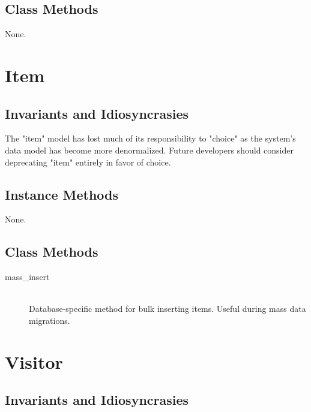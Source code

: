 \documentclass[11pt]{book}
\begin{document}
\subsection{Class Methods}

None.









\section{Item}

\subsection{Invariants and Idiosyncrasies}

The "item" model has lost much of its responsibility to "choice" as the system's data model has become more denormalized.  Future developers should consider deprecating "item" entirely in favor of choice.

\subsection{Instance Methods}

None.

\subsection{Class Methods}

\begin{description}
	\item[mass\_insert]  \hfill \\
  Database-specific method for bulk inserting items.  Useful during mass data migrations.

\end{description}






\section{Visitor}

\subsection{Invariants and Idiosyncrasies}
\end{document}
